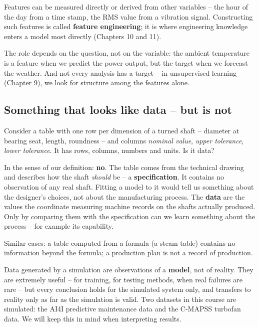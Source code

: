 \documentclass[
  letterpaper,
  DIV=11,
  numbers=noendperiod]{scrreprt}
\begin{document}
Features can be measured directly or derived from other variables -- the
hour of the day from a time stamp, the RMS value from a vibration
signal. Constructing such features is called \textbf{feature
engineering}; it is where engineering knowledge enters a model most
directly (Chapters 10 and 11).

The role depends on the question, not on the variable: the ambient
temperature is a feature when we predict the power output, but the
target when we forecast the weather. And not every analysis has a target
-- in unsupervised learning (Chapter 9), we look for structure among the
features alone.

\subsection{Something that looks like data -- but is
not}\label{something-that-looks-like-data-but-is-not}

Consider a table with one row per dimension of a turned shaft --
diameter at bearing seat, length, roundness -- and columns \emph{nominal
value}, \emph{upper tolerance}, \emph{lower tolerance}. It has rows,
columns, numbers and units. Is it data?

In the sense of our definition: \textbf{no}. The table comes from the
technical drawing and describes how the shaft \emph{should} be -- a
\textbf{specification}. It contains no observation of any real shaft.
Fitting a model to it would tell us something about the designer's
choices, not about the manufacturing process. The \textbf{data} are the
values the coordinate measuring machine records on the shafts actually
produced. Only by comparing them with the specification can we learn
something about the process -- for example its capability.

Similar cases: a table computed from a formula (a steam table) contains
no information beyond the formula; a production plan is not a record of
production.

\begin{tcolorbox}[enhanced jigsaw, left=2mm, title=\textcolor{quarto-callout-tip-color}{\faLightbulb}\hspace{0.5em}{Simulated data}, opacityback=0, breakable, rightrule=.15mm, arc=.35mm, toptitle=1mm, colbacktitle=quarto-callout-tip-color!10!white, opacitybacktitle=0.6, coltitle=black, colframe=quarto-callout-tip-color-frame, bottomrule=.15mm, leftrule=.75mm, bottomtitle=1mm, titlerule=0mm, toprule=.15mm, colback=white]

Data generated by a simulation are observations of a \textbf{model}, not
of reality. They are extremely useful -- for training, for testing
methods, when real failures are rare -- but every conclusion holds for
the simulated system only, and transfers to reality only as far as the
simulation is valid. Two datasets in this course are simulated: the AI4I
predictive maintenance data and the C-MAPSS turbofan data. We will keep
this in mind when interpreting results.

\end{tcolorbox}
\end{document}
